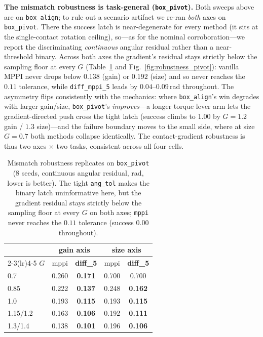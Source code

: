 \documentclass[journal]{IEEEtran}
\begin{document}
\textbf{The mismatch robustness is task-general (\texttt{box\_pivot}).} Both
sweeps above are on \texttt{box\_align}; to rule out a scenario artifact we re-ran
\emph{both} axes on \texttt{box\_pivot}. There the success latch is near-degenerate
for every method (it sits at the single-contact rotation ceiling), so---as for the
nominal corroboration---we report the discriminating \emph{continuous} angular
residual rather than a near-threshold binary. Across both axes the gradient's
residual stays strictly below the sampling floor at every $G$
(Table~\ref{tab:mismatch_pivot} and Fig.~\ref{fig:robustness_pivot}): vanilla MPPI never drops below $0.138$ (gain) or
$0.192$ (size) and so never reaches the $0.11$ tolerance, while
\texttt{diff\_mppi\_5} leads by $0.04$--$0.09$\,rad throughout. The asymmetry
flips consistently with the mechanics: where \texttt{box\_align}'s win degrades
with larger gain/size, \texttt{box\_pivot}'s \emph{improves}---a longer torque
lever arm lets the gradient-directed push cross the tight latch (success climbs to
$1.00$ by $G\!=\!1.2$ gain / $1.3$ size)---and the failure boundary moves to the
small side, where at size $G\!=\!0.7$ both methods collapse identically. The
contact-gradient robustness is thus two axes $\times$ two tasks, consistent across
all four cells.

\begin{table}[t]
\centering
\caption{%
  Mismatch robustness replicates on \texttt{box\_pivot} (8 seeds, continuous
  angular residual, rad, lower is better). The tight \texttt{ang\_tol} makes the
  binary latch uninformative here, but the gradient residual stays strictly below
  the sampling floor at every $G$ on both axes; \texttt{mppi} never reaches the
  $0.11$ tolerance (success $0.00$ throughout).%
}
\label{tab:mismatch_pivot}
\begin{tabular}{lcccc}
\toprule
 & \multicolumn{2}{c}{gain axis} & \multicolumn{2}{c}{size axis} \\
\cmidrule(lr){2-3}\cmidrule(lr){4-5}
$G$ & mppi & \textbf{diff\_5} & mppi & \textbf{diff\_5} \\
\midrule
0.7       & 0.260 & \textbf{0.171} & 0.700 & 0.700 \\
0.85      & 0.222 & \textbf{0.137} & 0.248 & \textbf{0.162} \\
1.0       & 0.193 & \textbf{0.115} & 0.193 & \textbf{0.115} \\
1.15/1.2  & 0.163 & \textbf{0.106} & 0.192 & \textbf{0.111} \\
1.3/1.4   & 0.138 & \textbf{0.101} & 0.196 & \textbf{0.106} \\
\bottomrule
\end{tabular}
\end{table}
\end{document}
